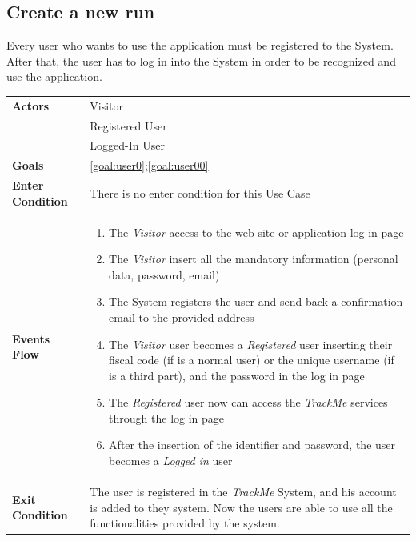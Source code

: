  \subsection{Create a new run}
Every user who wants to use the application must be registered to the System.
After that, the user has to log in into the System in order to be recognized and use the application.

\begin{table}[H]
	\centering
    
    \begin{tabular}{|p{3.5cm}|p{10.3cm}|}
    
    \hline
    \textbf{\large{Actors}}  			& \tabitem Visitor 									\\
    				 					& \tabitem Registered User							\\
                     					& \tabitem Logged-In User 							\\
    \hline
    \textbf{\large{Goals}} 				& \ref{goal:user0};\ref{goal:user00}\\
    
    \hline
    \textbf{\large{Enter Condition}}	& There is no enter condition for this Use Case		\\
    
    \hline
    \textbf{\large{Events Flow}}		& \begin{enumerate}[leftmargin=0.5cm]
                                          	\item The \emph{Visitor}  access to the web site or application log in page
                                            \item The \emph{Visitor} insert all the mandatory information (personal data, password, email)
                                            \item The System registers the user and send back a confirmation email to the provided address
                                            \item The \emph{Visitor} user becomes a \emph{Registered} user inserting their fiscal code (if is a normal user) or the unique username (if is a third part), and the password in the log in page   
                                            \item The \emph{Registered} user now can access the \emph{TrackMe} services through the log in page
                                            
                                            \item After the insertion of the identifier and password, the user becomes a \emph{Logged in} user
                                          \end{enumerate}
    										\\
    \hline
    \textbf{\large{Exit Condition}} 	& The user is registered in the \emph{TrackMe} System, and his account is added to they system. Now the users are able to use all the functionalities provided by the system. \\
    

\end{tabular}
\end{table}
